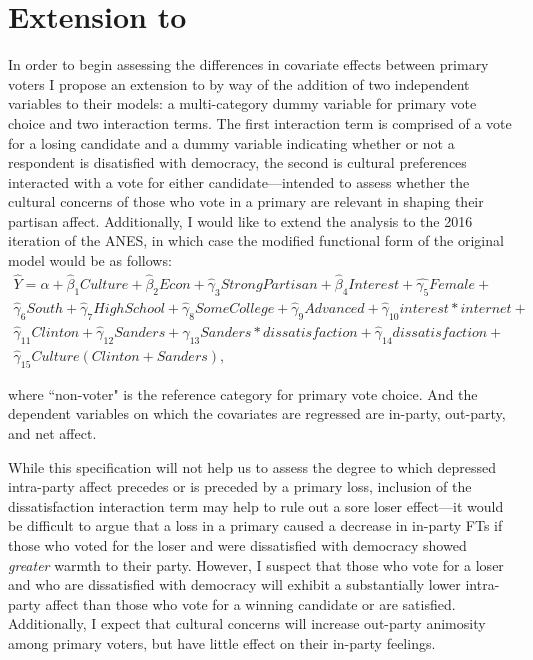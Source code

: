 \documentclass[12pt]{article}
\begin{document}
\section{Extension to \citet{iyengar2012affect} }

In order to begin assessing the differences in covariate effects between primary voters I propose an extension to \citet{iyengar2012affect} by way of the addition of two independent variables to their models: a multi-category dummy variable for primary vote choice and two interaction terms. The first interaction term is comprised of a vote for a losing candidate and a dummy variable indicating whether or not a respondent is disatisfied with democracy, the second is cultural preferences interacted with a vote for either candidate---intended to assess whether the cultural concerns of those who vote in a primary are relevant in shaping their partisan affect. Additionally, I would like to extend the analysis to the 2016 iteration of the ANES, in which case the modified functional form of the original model would be as follows:
\begin{equation}
\begin{split}
\hat{Y} = \alpha + \hat{\beta}_1{\mathit{Culture}} + \hat{\beta}_2\mathit{Econ} + \hat{\gamma}_3\mathit{Strong Partisan} +  \hat{\beta}_4\mathit{Interest} +  \hat{\gamma_5}\mathit{Female} + \\ \hat{\gamma}_6\mathit{South} + \hat{\gamma}_7\mathit{High School} + \hat{\gamma}_8\mathit{Some College} + \hat{\gamma}_9\mathit{Advanced} + \hat{\gamma}_{10}\mathit{interest}*\mathit{internet} + \\
\hat{\gamma}_{11}\mathit{Clinton} + \hat{\gamma}_{12}\mathit{Sanders} + \hat{\gamma}_{13}\mathit{Sanders}*\mathit{dissatisfaction} +\hat{\gamma}_{14}\mathit{dissatisfaction} +\\ \hat{\gamma}_{15}\mathit{Culture}(\mathit{Clinton} + \mathit{Sanders})  ,
\end{split}
\end{equation}

\noindent where ``non-voter" is the reference category for primary vote choice. And the dependent variables on which the covariates are regressed are in-party, out-party, and net affect.

 While this specification will not help us to assess the degree to which depressed intra-party affect precedes or is preceded by a primary loss, inclusion of the dissatisfaction interaction term may help to rule out a sore loser effect---it would be difficult to argue that a loss in a primary caused a decrease in in-party FTs if those who voted for the loser and were dissatisfied with democracy showed \textit{greater} warmth to their party. However, I suspect that those who vote for a loser and who are dissatisfied with democracy will exhibit a substantially lower intra-party affect than those who vote for a winning candidate or are satisfied. Additionally, I expect that cultural concerns will increase out-party animosity among primary voters, but have little effect on their in-party feelings.
 
\end{document}

